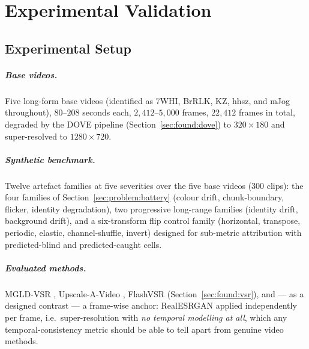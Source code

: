 \chapter{Experimental Validation}
\label{ch:experiments}


\section{Experimental Setup}
\label{sec:exp:setup}

\paragraph{Base videos.} Five long-form base videos (identified as 7WHI, BrRLK, KZ,
hhsz, and mJog throughout), $80$--$208$ seconds each, $2{,}412$--$5{,}000$ frames,
$22{,}412$ frames in total, degraded by the DOVE pipeline
(Section~\ref{sec:found:dove}) to $320\times180$ and super-resolved to
$1280\times720$.

\paragraph{Synthetic benchmark.} Twelve artefact families at five severities over the
five base videos ($300$ clips): the four families of
Section~\ref{sec:problem:battery} (colour drift, chunk-boundary, flicker, identity
degradation), two progressive long-range families (identity drift, background drift),
and a six-transform flip control family (horizontal, transpose, periodic, elastic,
channel-shuffle, invert) designed for sub-metric attribution with predicted-blind and
predicted-caught cells.

\paragraph{Evaluated methods.} MGLD-VSR \cite{he_mgld_2024}, Upscale-A-Video
\cite{zhou_upscale_2024}, FlashVSR \cite{zhuang_flashvsr_2025}
(Section~\ref{sec:found:vsr}), and --- as a designed contrast --- a
frame-wise anchor: RealESRGAN \cite{chan_realbasicvsr_2022} applied
independently per frame, i.e.\ super-resolution with \emph{no temporal
modelling at all}, which any temporal-consistency metric should be able to
tell apart from genuine video methods.

